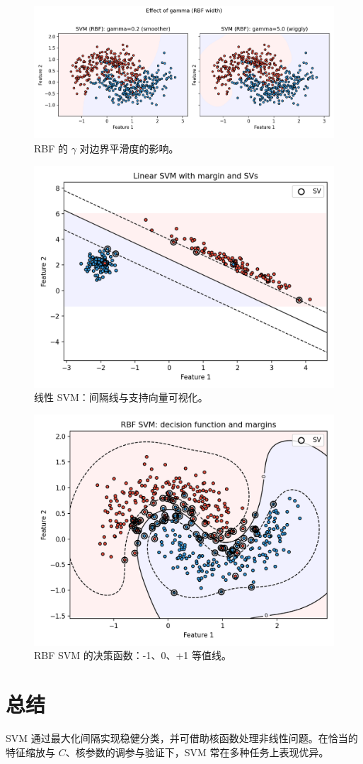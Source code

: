 \documentclass[UTF8,zihao=-4]{ctexart}
\begin{document}
\begin{figure}[H]
  \centering
  \includegraphics[width=0.95\linewidth]{svm_gamma_compare.png}
  \caption{RBF 的 $\gamma$ 对边界平滑度的影响。}
  \label{fig:svm_gamma_cn}
\end{figure}
\FloatBarrier

\begin{figure}[H]
  \centering
  \includegraphics[width=0.85\linewidth]{svm_margin_support_vectors.png}
  \caption{线性 SVM：间隔线与支持向量可视化。}
  \label{fig:svm_margin_cn}
\end{figure}
\FloatBarrier

\begin{figure}[H]
  \centering
  \includegraphics[width=0.85\linewidth]{svm_decision_function.png}
  \caption{RBF SVM 的决策函数：-1、0、+1 等值线。}
  \label{fig:svm_df_cn}
\end{figure}
\FloatBarrier

\section{总结}
SVM 通过最大化间隔实现稳健分类，并可借助核函数处理非线性问题。在恰当的特征缩放与 $C$、核参数的调参与验证下，SVM 常在多种任务上表现优异。
\end{document}
